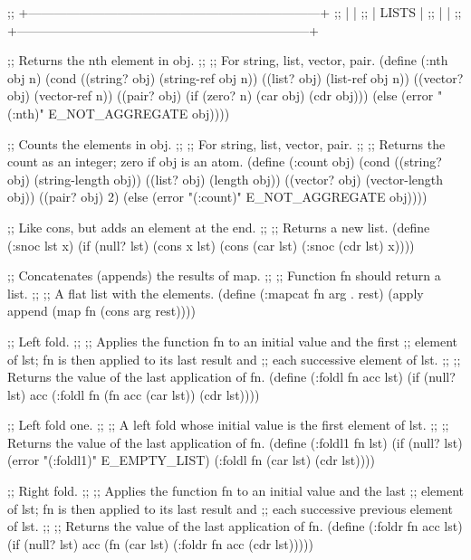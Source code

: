;; +---------------------------------------------------------------------+
;; |                                                                     |
;; |                              LISTS                                  |
;; |                                                                     |
;; +---------------------------------------------------------------------+


;; Returns the nth element in obj.
;;
;; For string, list, vector, pair.
(define (:nth obj n)
  (cond ((string? obj) (string-ref obj n))
        ((list? obj)   (list-ref obj n))
        ((vector? obj) (vector-ref n))
        ((pair? obj)   (if (zero? n) (car obj) (cdr obj)))
        (else          (error "(:nth)" E_NOT_AGGREGATE obj))))


;; Counts the elements in obj.
;;
;; For string, list, vector, pair.
;;
;; Returns the count as an integer; zero if obj is an atom.
(define (:count obj)
  (cond ((string? obj) (string-length obj))
        ((list? obj)   (length obj))
        ((vector? obj) (vector-length obj))
        ((pair? obj)   2)
        (else          (error "(:count)" E_NOT_AGGREGATE obj))))


;; Like cons, but adds an element at the end.
;;
;; Returns a new list.
(define (:snoc lst x)
  (if (null? lst)
    (cons x lst)
    (cons (car lst) (:snoc (cdr lst) x))))


;; Concatenates (appends) the results of map.
;;
;; Function fn should return a list.
;;
;; A flat list with the elements.
(define (:mapcat fn arg . rest)
  (apply append (map fn (cons arg rest))))


;; Left fold.
;;
;; Applies the function fn to an initial value and the first
;; element of lst; fn is then applied to its last result and
;; each successive element of lst.
;;
;; Returns the value of the last application of fn.
(define (:foldl fn acc lst)
  (if (null? lst)
      acc
      (:foldl fn (fn acc (car lst)) (cdr lst))))


;; Left fold one.
;;
;; A left fold whose initial value is the first element of lst.
;;
;; Returns the value of the last application of fn.
(define (:foldl1 fn lst)
  (if (null? lst)
    (error "(:foldl1)" E_EMPTY_LIST)
    (:foldl fn (car lst) (cdr lst))))


;; Right fold.
;;
;; Applies the function fn to an initial value and the last
;; element of lst; fn is then applied to its last result and 
;; each successive previous element of lst.
;;
;; Returns the value of the last application of fn.
(define (:foldr fn acc lst)
  (if (null? lst)
      acc
      (fn (car lst) (:foldr fn acc (cdr lst)))))


